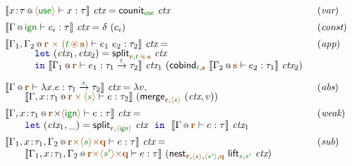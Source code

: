 \begin{figure*}[!t]
\begin{equation*}
\begin{array}{ll}
 \sem{\coctx{x\!:\!\tau}{\alift{\cunit}} \vdash x : \tau }~\ctx =
   \ident{counit}_{\cunit}~\ctx & (\emph{var})
\\[0.5em]
\sem{\coctx{\Gamma}{\czero} \vdash c_i : \tau }~\ctx =
  \delta~(c_i) & (\emph{const})
\\[0.5em]
\sem{\coctx{\Gamma_1, \Gamma_2}{\aclrd{\textbf{r}\;\atimes\;(\cclrd{t} \,\aseq\, \aclrd{\textbf{s}})}} \vdash e_1~e_2 : \tau_2}~\ctx = & (\emph{app})\\[-0.25em]
  \hspace{2.5em}
  \begin{array}{l}  
  \kvd{let}~(\ctx_1, \ctx_2) = \ident{split}_{\aclrd{\textbf{r}}, \cclrd{t} \,\aseq\, \aclrd{\textbf{s}}}~\ctx\\[-0.25em]
  \kvd{in}~\sem{\coctx{\Gamma_1}{\aclrd{\textbf{r}}} \vdash e_1 : \tau_1 \xrightarrow{\cclrd{t}} \tau_2}~\ctx_1~
      (\ident{cobind}_{\cclrd{t}, \aclrd{\textbf{s}}}~\sem{\coctx{\Gamma_2}{\aclrd{\textbf{s}}} \vdash e_2 : \tau_1 }~\ctx_2)
  \end{array}
\\[1.5em]
\sem{\coctx{\Gamma}{\aclrd{\textbf{r}}} \vdash \lambda x.e : \tau_1 \xrightarrow{\cclrd{s}} \tau_2 }~\ctx = \lambda v.& (\emph{abs})\\[-0.25em]
\hspace{2em}\sem{\coctx{\Gamma, x\!:\!\tau_1}{\aclrd{\textbf{r}}\,\atimes\,\alift{\cclrd{s}}} \vdash e : \tau_2}
  ~(\ident{merge}_{\aclrd{\textbf{r}}, \alift{\cclrd{s}}}~(\ctx, v))
\\[0.5em]
\sem{\coctx{\Gamma,x \!:\! \tau_1}{\aclrd{\textbf{r}} \cons \alift{ \czero }} \vdash e : \tau}~\ctx = & (\emph{weak}) \\
  \hspace{2em}
  \kvd{let}~(\ctx_1, \_) = \ident{split}_{\aclrd{\textbf{r}}, \alift{\czero}}~\ctx~~\kvd{in}~~
  \sem{\coctx{\Gamma}{ \aclrd{\textbf{r}} } \vdash e : \tau}~\ctx_1
\\[0.5em]
\sem{\coctx{\Gamma_1,x\!:\!\tau_1,\Gamma_2}{\aclrd{\textbf{r}} \atimes \alift{\cclrd{s}} \atimes \aclrd{\textbf{q}}} \vdash e : \tau}~\ctx = & (\emph{sub})\\
  \hspace{2em}
  \sem{\coctx{\Gamma_1,x\!:\!\tau_1,\Gamma_2}{\aclrd{\textbf{r}} \atimes \alift{\cclrd{s'}} \atimes \aclrd{\textbf{q}}} \vdash e : \tau}~
  (\ident{nest}_{\aclrd{\textbf{r}}, \alift{\cclrd{s}}, \alift{\cclrd{s'}}, \aclrd{\textbf{q}}}~\ident{lift}_{\cclrd{s}, \cclrd{s'}}~\ctx)

\end{array}
\end{equation*}
\end{figure*}
